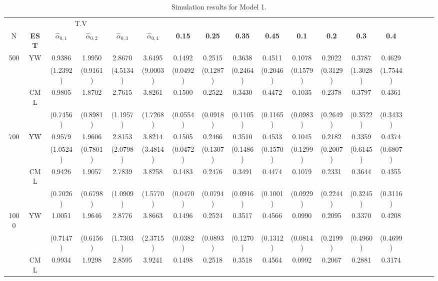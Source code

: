 \documentclass{article}
\begin{document}
\begin{table}[ht]
\centering
\caption{Simulation results for Model 1.}
\begin{adjustbox}{width=\textwidth}
\begin{tabularx}{\textwidth}{cccccccccccccccccc}
\toprule
 & \multicolumn{4}{c}{T.V} & \multicolumn{10}{c}{} \\
\cmidrule(lr){2-5}
N & \textbf{EST} & \textbf{$\hat{\alpha}_{0,1}$} & \textbf{$\hat{\alpha}_{0,2}$} & \textbf{$\hat{\alpha}_{0,3}$} & \textbf{$\hat{\alpha}_{0,4}$} & \textbf{0.15} & \textbf{0.25} & \textbf{0.35} & \textbf{0.45} & \textbf{0.1} & \textbf{0.2} & \textbf{0.3} & \textbf{0.4} \\ 
\midrule
500 & YW & 0.9386 & 1.9950 & 2.8670 & 3.6495 & 0.1492 & 0.2515 & 0.3638 & 0.4511 & 0.1078 & 0.2022 & 0.3787 & 0.4629 \\ 
 & & (1.2392) & (0.9161) & (4.5134) & (9.0003) & (0.0492) & (0.1287) & (0.2464) & (0.2046) & (0.1579) & (0.3129) & (1.3028) & (1.7544) \\ 
 & CML & 0.9805 & 1.8702 & 2.7615 & 3.8261 & 0.1500 & 0.2522 & 0.3430 & 0.4472 & 0.1035 & 0.2378 & 0.3797 & 0.4361 \\ 
 & & (0.7456) & (0.8981) & (1.1957) & (1.7268) & (0.0554) & (0.0918) & (0.1105) & (0.1165) & (0.0983) & (0.2649) & (0.3522) & (0.3433) \\ 
\cline{1-14}
700 & YW & 0.9579 & 1.9606 & 2.8153 & 3.8214 & 0.1505 & 0.2466 & 0.3510 & 0.4533 & 0.1045 & 0.2182 & 0.3359 & 0.4374 \\ 
 & & (1.0524) & (0.7801) & (2.0798) & (3.4814) & (0.0472) & (0.1307) & (0.1486) & (0.1570) & (0.1299) & (0.2007) & (0.6145) & (0.6807) \\ 
 & CML & 0.9426 & 1.9057 & 2.7839 & 3.8258 & 0.1483 & 0.2476 & 0.3491 & 0.4474 & 0.1079 & 0.2331 & 0.3644 & 0.4355 \\ 
 & & (0.7026) & (0.6798) & (1.0909) & (1.5770) & (0.0470) & (0.0794) & (0.0916) & (0.1001) & (0.0929) & (0.2244) & (0.3245) & (0.3116) \\ 
\cline{1-14}
1000 & YW & 1.0051 & 1.9646 & 2.8776 & 3.8663 & 0.1496 & 0.2524 & 0.3517 & 0.4566 & 0.0990 & 0.2095 & 0.3370 & 0.4208 \\ 
 & & (0.7147) & (0.6156) & (1.7303) & (2.3715) & (0.0382) & (0.0893) & (0.1270) & (0.1312) & (0.0814) & (0.2199) & (0.4960) & (0.4699) \\ 
 & CML & 0.9934 & 1.9298 & 2.8595 & 3.9241 & 0.1498 & 0.2518 & 0.3518 & 0.4564 & 0.0992 & 0.2067 & 0.2881 & 0.3174 \\ 

\end{tabularx}
\end{adjustbox}
\end{table}
\end{document}
